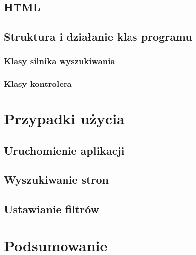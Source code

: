 \documentclass[licencjacka]{pracadypl}
\theoremstyle{definition}
\newcommand{\linia}{\rule{\linewidth}{0.4mm}}
\begin{document}
\section{HTML}
\section{Struktura i działanie klas programu}
\subsection{Klasy silnika wyszukiwania}
\subsection{Klasy kontrolera}


\chapter{Przypadki użycia}
\section{Uruchomienie aplikacji}
\section{Wyszukiwanie stron}
\section{Ustawianie filtrów}


\chapter{Podsumowanie}
%


 

	
	
\end{document}
